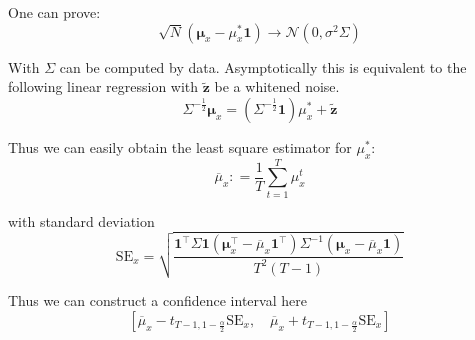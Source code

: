One can prove:
$$
\sqrt { N } \left( \boldsymbol { \mu } _ { x } - \mu _ { x } ^ { * } \mathbf { 1 } \right) \rightarrow \mathcal { N } \left( 0 , \sigma^2\Sigma\right)
$$

With $\Sigma$ can be computed by data. Asymptotically this is equivalent to the following linear regression with $\tilde { \boldsymbol { z } }$ be a whitened noise.
$$
\Sigma ^ { - \frac { 1 } { 2 } } \boldsymbol { \mu } _ { x } = \left( \Sigma ^ { - \frac { 1 } { 2 } } \mathbf { 1 } \right) \mu _ { x } ^ { * } + \tilde { \boldsymbol { z } }
$$

Thus we can easily obtain the least square estimator for $\mu _ { x } ^ { * } $:
$$
\overline { \mu } _ { x } : = \frac { 1 } { T } \sum _ { t = 1 }^{T} \mu _ { x } ^ { t }
$$

with standard deviation
$$
\mathrm { SE } _ { x } = \sqrt { \frac { \mathbf { 1 } ^ { \top } \Sigma \mathbf { 1 } \left( \boldsymbol { \mu } _ { x } ^ { \top } - \overline { \mu } _ { x } \mathbf { 1 } ^ { \top } \right) \Sigma ^ { - 1 } \left( \boldsymbol { \mu } _ { x } - \overline { \mu } _ { x } \mathbf { 1 } \right) } { T ^ { 2 } ( T - 1 ) } }
$$

Thus we can construct a confidence interval here
$$
\left[ \overline { \mu } _ { x } - t _ { T - 1,1 - \frac { \alpha } { 2 } } \mathrm { SE } _ { x } , \quad \overline { \mu } _ { x } + t _ { T - 1,1 - \frac { \alpha } { 2 } } \mathrm { SE } _ { x } \right]
$$









